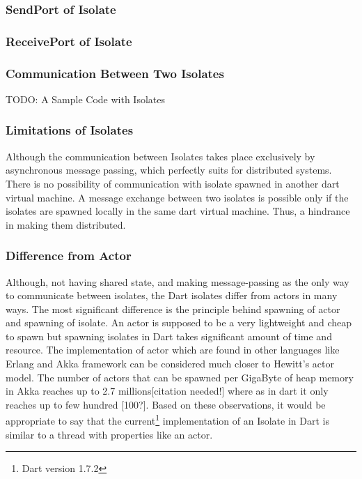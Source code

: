   \subsubsection{SendPort of Isolate}
  \subsubsection{ReceivePort of Isolate}
  \subsubsection{Communication Between Two Isolates}
  TODO: A Sample Code with Isolates

  \subsubsection{Limitations of Isolates}
  Although the communication between Isolates takes place exclusively by asynchronous message passing, which perfectly suits for distributed systems. There is no possibility of communication with isolate spawned in another dart virtual machine. A message exchange between two isolates is possible only if the isolates are spawned locally in the same dart virtual machine. Thus, a hindrance in making them distributed.

  \subsubsection{Difference from Actor}
Although, not having shared state, and making message-passing as the only way to communicate between isolates, the Dart isolates differ from actors in many ways. The most significant difference is the principle behind spawning of actor and spawning of isolate. An actor is supposed to be a very lightweight and cheap to spawn but spawning isolates in Dart takes significant amount of time and resource. The implementation of actor which are found in other languages like Erlang and Akka framework can be considered much closer to Hewitt's actor model. The number of actors that can be spawned per GigaByte of heap memory in Akka reaches up to 2.7 millions[citation needed!] where as in dart it only reaches up to few hundred [100?]. Based on these observations, it would be appropriate to say that the current\footnote{Dart version 1.7.2} implementation of an Isolate in Dart is \textemdash{} similar to a thread with properties like an actor.

